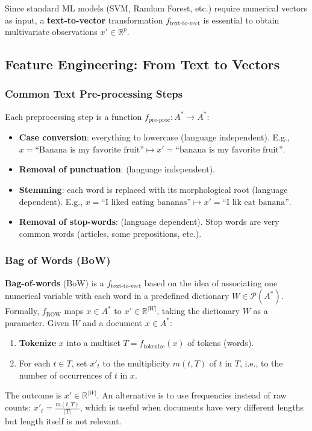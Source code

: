 Since standard ML models (SVM, Random Forest, etc.) require numerical vectors as input, a \textbf{text-to-vector} transformation $f_{\text{text-to-vect}}$ is essential to obtain multivariate observations $x' \in \mathbb{R}^p$.

\subsection{Feature Engineering: From Text to Vectors}
\subsubsection{Common Text Pre-processing Steps}

Each preprocessing step is a function $f_{\text{pre-proc}}: A^* \to A^*$:
\begin{itemize}
    \item \textbf{Case conversion}: everything to lowercase (language independent). E.g., $x = \text{``Banana is my favorite fruit''} \mapsto x' = \text{``banana is my favorite fruit''}$.
    \item \textbf{Removal of punctuation}: (language independent).
    \item \textbf{Stemming}: each word is replaced with its morphological root (language dependent). E.g., $x = \text{``I liked eating bananas''} \mapsto x' = \text{``I lik eat banana''}$.
    \item \textbf{Removal of stop-words}: (language dependent). Stop words are very common words (articles, some prepositions, etc.).
\end{itemize}
\subsubsection{Bag of Words (BoW)}

\textbf{Bag-of-words} (BoW) is a $f_{\text{text-to-vect}}$ based on the idea of associating one numerical variable with each word in a predefined dictionary $W \in \mathcal{P}(A^*)$. Formally, $f_{\text{BOW}}$ maps $x \in A^*$ to $x' \in \mathbb{R}^{|W|}$, taking the dictionary $W$ as a parameter. Given $W$ and a document $x \in A^*$:
\begin{enumerate}
    \item \textbf{Tokenize} $x$ into a multiset $T = f_{\text{tokenize}}(x)$ of tokens (words).
    \item For each $t \in T$, set $x'_t$ to the multiplicity $m(t, T)$ of $t$ in $T$, i.e., to the number of occurrences of $t$ in $x$.
\end{enumerate}
The outcome is $x' \in \mathbb{R}^{|W|}$. An alternative is to use frequencies instead of raw counts: $x'_t = \frac{m(t, T)}{|T|}$, which is useful when documents have very different lengths but length itself is not relevant.

